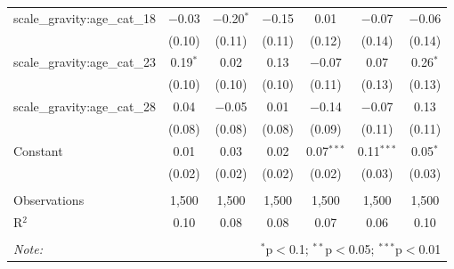\documentclass[
]{article}
\begin{document}
\begin{sidewaystable}[!htbp]
\begin{tabular}{@{\extracolsep{1pt}}lcccccc}
  scale\_gravity:age\_cat\_18 & $-$0.03 & $-$0.20$^{*}$ & $-$0.15 & 0.01 & $-$0.07 & $-$0.06 \\ 
  & (0.10) & (0.11) & (0.11) & (0.12) & (0.14) & (0.14) \\ 
  scale\_gravity:age\_cat\_23 & 0.19$^{*}$ & 0.02 & 0.13 & $-$0.07 & 0.07 & 0.26$^{*}$ \\ 
  & (0.10) & (0.10) & (0.10) & (0.11) & (0.13) & (0.13) \\ 
  scale\_gravity:age\_cat\_28 & 0.04 & $-$0.05 & 0.01 & $-$0.14 & $-$0.07 & 0.13 \\ 
  & (0.08) & (0.08) & (0.08) & (0.09) & (0.11) & (0.11) \\ 
  Constant & 0.01 & 0.03 & 0.02 & 0.07$^{***}$ & 0.11$^{***}$ & 0.05$^{*}$ \\ 
  & (0.02) & (0.02) & (0.02) & (0.02) & (0.03) & (0.03) \\ 
 \hline \\[-1.8ex] 
Observations & 1,500 & 1,500 & 1,500 & 1,500 & 1,500 & 1,500 \\ 
R$^{2}$ & 0.10 & 0.08 & 0.08 & 0.07 & 0.06 & 0.10 \\ 
\hline 
\hline \\[-1.8ex] 
\textit{Note:}  & \multicolumn{6}{r}{$^{*}$p$<$0.1; $^{**}$p$<$0.05; $^{***}$p$<$0.01} \\ 
\end{tabular} 
\end{sidewaystable}
\end{document}
